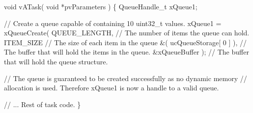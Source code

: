 \begin{DoxyPre}void vATask( void *pvParameters )
\{
QueueHandle\_t xQueue1;\end{DoxyPre}



\begin{DoxyPre}   // Create a queue capable of containing 10 uint32\_t values.
   xQueue1 = xQueueCreate( QUEUE\_LENGTH, // The number of items the queue can hold.
                        ITEM\_SIZE     // The size of each item in the queue
                        \&( ucQueueStorage[ 0 ] ), // The buffer that will hold the items in the queue.
                        \&xQueueBuffer ); // The buffer that will hold the queue structure.\end{DoxyPre}



\begin{DoxyPre}   // The queue is guaranteed to be created successfully as no dynamic memory
   // allocation is used.  Therefore xQueue1 is now a handle to a valid queue.\end{DoxyPre}



\begin{DoxyPre}   // ... Rest of task code.
\}
\end{DoxyPre}
 